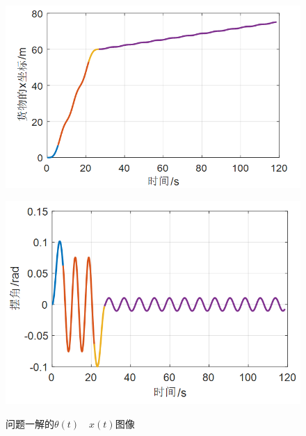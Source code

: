 \documentclass[withoutpreface,bwprint]{cumcmthesis} %
\begin{document}
\begin{figure}[!h]
    \centering
    \begin{minipage}[c]{0.48\textwidth}
        \centering
        \includegraphics[width=\textwidth]{p1x.png}
        \label{fig:sample-figure-a}
    \end{minipage}
    \begin{minipage}[c]{0.48\textwidth}
        \centering
        \includegraphics[width=\textwidth]{p1theta.png}
        \label{fig:sample-figure-b}
    \end{minipage}
    \caption{问题一解的$\theta(t)\quad x(t)$图像}
    \label{fig:sample-figure}
\end{figure}
\end{document}
